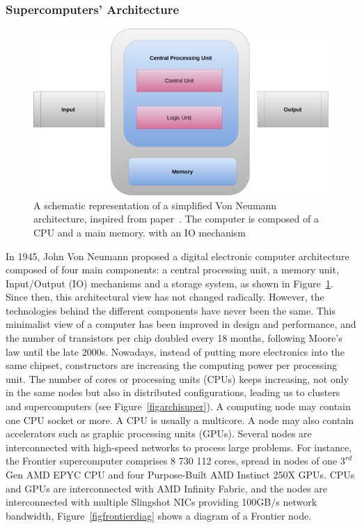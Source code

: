 \subsubsection{Supercomputers' Architecture}

\begin{figure}[hb]\centering
\includegraphics[scale=0.15]{figures/CPU.pdf}
\caption{A schematic representation of a simplified Von Neumann architecture, inspired from paper~\cite{shankar_looking_2017}. The computer is composed of a CPU and a main memory. with an IO mechanism}
\label{figarchivon}
\end{figure}

In 1945, John Von Neumann proposed a digital electronic computer architecture composed of four main components:  a central processing unit, a memory unit, Input/Output (IO) mechanisms and a storage system, as shown in Figure~\ref{figarchivon}. 
Since then, this architectural view has not changed radically. However, the technologies behind the different components have never been the same. 
This minimalist view of a computer has been improved in design and performance, and the number of transistors per chip doubled every 18 months, following Moore's law until the late 2000s. 
Nowadays, instead of putting more electronics into the same chipset, constructors are increasing the computing power per processing unit. The number of cores or processing units (CPUs) keeps increasing, not only in the same nodes but also in distributed configurations, leading us to clusters and supercomputers (see Figure~\ref{figarchisuper}). 
A computing node may contain one CPU socket or more. A CPU is usually a multicore. A node may also contain accelerators such as graphic processing units (GPUs). Several nodes are interconnected with high-speed networks to process large problems. 
For instance, the Frontier supercomputer comprises 8 730 112 cores, spread in nodes of one $3^{rd}$ Gen AMD EPYC CPU and four Purpose-Built AMD Instinct 250X GPUs. CPUs and GPUs are interconnected with AMD Infinity Fabric, and the nodes are interconnected with multiple Slingshot NICs providing 100GB/s network bandwidth\cite{frontier}, Figure~\ref{figfrontierdiag} shows a diagram of a Frontier node. 

